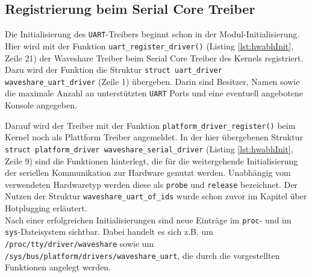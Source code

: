 \subsection{Registrierung beim Serial Core Treiber} %
Die Initialisierung des \texttt{UART}-Treibers beginnt schon in der Modul-Initialisierung. 
Hier wird mit der Funktion \texttt{uart_register_driver()} (Listing \ref{lst:hwabhInit}, Zeile 21) der Waveshare Treiber beim Serial Core Treiber des Kernels registriert. Dazu wird der Funktion die Struktur \texttt{struct uart_driver waveshare_uart_driver} (Zeile 1) übergeben. Darin sind Besitzer, Namen sowie die maximale Anzahl an unterstützten \texttt{UART} Ports und eine eventuell angebotene Konsole angegeben. 

Darauf wird der Treiber mit der Funktion \texttt{platform_driver_register()} beim Kernel noch als Plattform Treiber angemeldet. In der hier übergebenen Struktur \\ 
\texttt{struct platform_driver waveshare_serial_driver} (Listing \ref{lst:hwabhInit}, Zeile 9) sind die Funktionen hinterlegt, die für die weitergehende Initialisierung der seriellen Kommunikation zur Hardware genutzt werden. 
Unabhängig vom verwendeten Hardwaretyp werden diese als \texttt{probe} und \texttt{release} bezeichnet. Der Nutzen der Struktur \texttt{waveshare\_uart\_of\_ids} wurde schon zuvor im Kapitel über Hotplugging erläutert. \\

Nach einer erfolgreichen Initialisierungen sind neue Einträge im \texttt{proc}- und im \texttt{sys}-Dateisystem sichtbar. Dabei handelt es sich z.B. um \texttt{/proc/tty/driver/waveshare} sowie um \texttt{/sys/bus/platform/drivers/waveshare\_uart}, die durch die vorgestellten Funktionen angelegt werden. 



